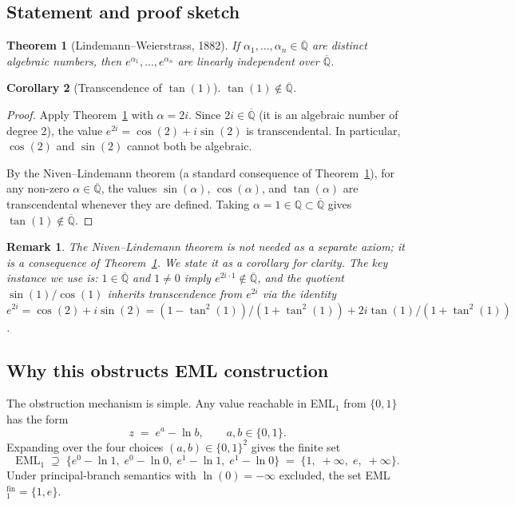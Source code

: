 \documentclass[11pt]{article}
\newtheorem{theorem}{Theorem}[section]
\newtheorem{corollary}[theorem]{Corollary}
\newtheorem{remark}{Remark}[section]
\begin{document}
\subsection{Statement and proof sketch}

\begin{theorem}[Lindemann--Weierstrass, 1882]
\label{thm:lw}
If $\alpha_1, \ldots, \alpha_n \in \overline{\mathbb{Q}}$ are distinct algebraic
numbers, then $e^{\alpha_1}, \ldots, e^{\alpha_n}$ are linearly independent over
$\overline{\mathbb{Q}}$.
\end{theorem}

\begin{corollary}[Transcendence of $\tan(1)$]
\label{cor:tan1}
$\tan(1) \notin \overline{\mathbb{Q}}$.
\end{corollary}

\begin{proof}
Apply Theorem~\ref{thm:lw} with $\alpha = 2i$.
Since $2i \in \overline{\mathbb{Q}}$ (it is an algebraic number of degree 2),
the value $e^{2i} = \cos(2) + i\sin(2)$ is transcendental.
In particular, $\cos(2)$ and $\sin(2)$ cannot both be algebraic.

By the Niven--Lindemann theorem (a standard consequence of Theorem~\ref{thm:lw}),
for any non-zero $\alpha \in \overline{\mathbb{Q}}$, the values $\sin(\alpha)$,
$\cos(\alpha)$, and $\tan(\alpha)$ are transcendental whenever they are defined.
Taking $\alpha = 1 \in \mathbb{Q} \subset \overline{\mathbb{Q}}$ gives
$\tan(1) \notin \overline{\mathbb{Q}}$.
\end{proof}

\begin{remark}
The Niven--Lindemann theorem is not needed as a separate axiom; it is a
consequence of Theorem~\ref{thm:lw}.  We state it as a corollary for clarity.
The key instance we use is: $1 \in \overline{\mathbb{Q}}$ and $1 \neq 0$ imply
$e^{2i \cdot 1} \notin \overline{\mathbb{Q}}$, and the quotient $\sin(1)/\cos(1)$
inherits transcendence from $e^{2i}$ via the identity
$e^{2i} = \cos(2) + i\sin(2) = (1 - \tan^2(1))/(1 + \tan^2(1)) + 2i\tan(1)/(1+\tan^2(1))$.
\end{remark}

\subsection{Why this obstructs EML construction}

The obstruction mechanism is simple.  Any value reachable in EML$_1$ from
$\{0, 1\}$ has the form
\[
  z \;=\; e^a - \ln b, \qquad a, b \in \{0, 1\}.
\]
Expanding over the four choices $(a, b) \in \{0,1\}^2$ gives the finite set
\[
  \mathrm{EML}_1 \;\supseteq\; \{e^0 - \ln 1,\; e^0 - \ln 0,\; e^1 - \ln 1,\; e^1 - \ln 0\}
  \;=\; \{1,\; +\infty,\; e,\; +\infty\}.
\]
Under principal-branch semantics with $\ln(0) = -\infty$ excluded, the set
EML$_1^{\mathrm{fin}} = \{1, e\}$.
\end{document}

